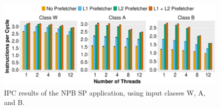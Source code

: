 \documentclass[AMA,final,STIX1COL]{WileyNJD-v2}
\begin{document}
\begin{figure}
    \centering
    \includegraphics[width=\linewidth]{figures/fig6.pdf}
    \caption{IPC results of the NPB SP application, using input classes W, A, and B.}
    \label{fig:nas_wab}
\end{figure}
\end{document}
